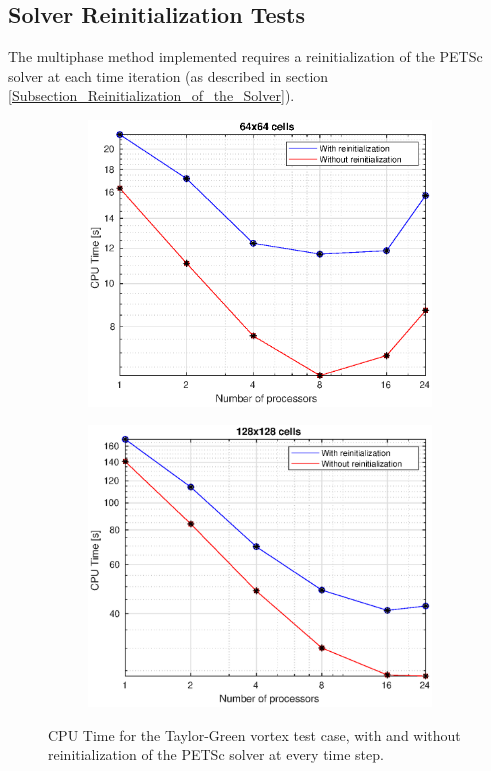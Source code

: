 \documentclass[11pt, a4paper, oneside, openany]{book}
\begin{document}
\subsection{Solver Reinitialization Tests}\label{Subsection_Solver_Reinitialization_Tests}
The multiphase method implemented requires a reinitialization of the PETSc solver at each time iteration (as described in section \ref{Subsection_Reinitialization_of_the_Solver}).\par
\begin{figure}[!ht]
	\centering
	\begin{subfigure}{.5\textwidth}
		\includegraphics[width=1\textwidth]{CPUTimeTG_64x64.eps}
		\caption[Taylor Green CPU Time 64x64 cells]{}\label{TGCPUTime64x64}
	\end{subfigure}%
	\begin{subfigure}{.5\textwidth}
		\includegraphics[width=1\textwidth]{CPUTimeTG_128x128.eps}
		\caption[Taylor Green CPU Time 128x128 cells]{}\label{TGCPUTime128x128}
	\end{subfigure}
	\caption[Reinitialization CPU Time cost]{CPU Time for the Taylor-Green vortex test case, with and without reinitialization of the PETSc solver at every time step.}\label{ReinitCPUTimeCost}
\end{figure}\noindent
\end{document}
